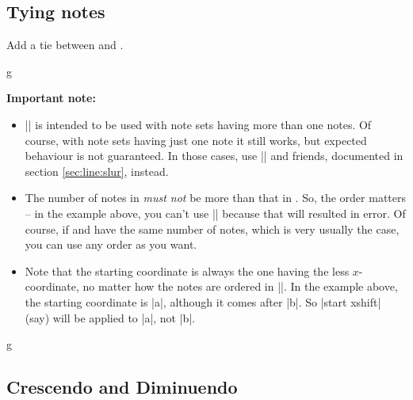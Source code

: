 \subsection{Tying notes}\label{sec:line:tie}
\begin{command}{\tmtie{}}
  Add a tie between  and .
\end{command}
\begin{codeexample}[]
\begin{tmline}
\begin{tmstaff}{g}{}
\end{tmstaff}
\end{tmline}
\end{codeexample}
{\bfseries\sffamily Important note:}
\begin{itemize}
  \item |\tmtie| is intended to be used with note sets having more than one notes. 
  Of course, with note sets having just one note it still works, but expected 
  behaviour is not guaranteed. In those cases, use |\tmslur| and friends, 
  documented in section \ref{sec:line:slur}, instead.
  \item The number of notes in  \emph{must not} be more than that in 
  . So, the order matters -- in the example above, you can't use 
  || because that will resulted in error. Of course, if  
  and  have the same number of notes, which is very usually the case, 
  you can use any order as you want.
  \item Note that the starting coordinate is always the one having the less 
  $x$-coordinate, no matter how the notes are ordered in |\tmtie|. In the example 
  above, the starting coordinate is |a|, although it comes after |b|. So 
  |start xshift| (say) will be applied to |a|, not |b|.
\end{itemize}
\begin{codeexample}[]
\begin{tmline}
\begin{tmstaff}{g}{}
\end{tmstaff}
\end{tmline}
\end{codeexample}
\subsection{Crescendo and Diminuendo}\label{sec:line:cresc-dim}
